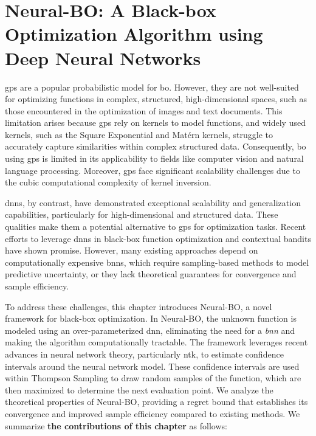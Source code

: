 \chapter{Neural-BO: A Black-box Optimization Algorithm using Deep Neural Networks} %
\label{chap:neural-bo}
\acfp{gp} are a popular probabilistic model for \ac{bo}. However, they are not well-suited for optimizing functions in complex, structured, high-dimensional spaces, such as those encountered in the optimization of images and text documents. This limitation arises because \acp{gp} rely on kernels to model functions, and widely used kernels, such as the Square Exponential and Mat\'ern kernels, struggle to accurately capture similarities within complex structured data. Consequently, \ac{bo} using \acp{gp} is limited in its applicability to fields like computer vision and natural language processing. Moreover, \acp{gp} face significant scalability challenges due to the cubic computational complexity of kernel inversion.

\acfp{dnn}, by contrast, have demonstrated exceptional scalability and generalization capabilities, particularly for high-dimensional and structured data. These qualities make them a potential alternative to \acp{gp} for optimization tasks. Recent efforts to leverage \acp{dnn} in black-box function optimization and contextual bandits have shown promise. However, many existing approaches depend on computationally expensive \acfp{bnn}, which require sampling-based methods to model predictive uncertainty, or they lack theoretical guarantees for convergence and sample efficiency.

To address these challenges, this chapter introduces Neural-BO, a novel framework for black-box optimization. In Neural-BO, the unknown function is modeled using an over-parameterized \ac{dnn}, eliminating the need for a \emph{\acf{bnn}} and making the algorithm computationally tractable. The framework leverages recent advances in neural network theory, particularly \acf{ntk}, to estimate confidence intervals around the neural network model. These confidence intervals are used within Thompson Sampling to draw random samples of the function, which are then maximized to determine the next evaluation point. We analyze the theoretical properties of Neural-BO, providing a regret bound that establishes its convergence and improved sample efficiency compared to existing methods. We summarize \textbf{the contributions of this chapter} as follows:

